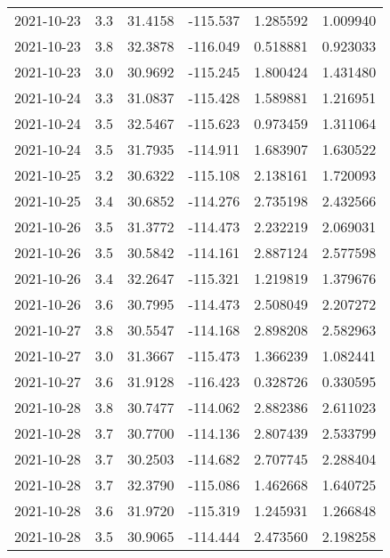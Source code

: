 \begin{tabular}{lrrrrr}
2021-10-23 &       3.3 &  31.4158 &  -115.537 &         1.285592 &         1.009940 \\
2021-10-23 &       3.8 &  32.3878 &  -116.049 &         0.518881 &         0.923033 \\
2021-10-23 &       3.0 &  30.9692 &  -115.245 &         1.800424 &         1.431480 \\
2021-10-24 &       3.3 &  31.0837 &  -115.428 &         1.589881 &         1.216951 \\
2021-10-24 &       3.5 &  32.5467 &  -115.623 &         0.973459 &         1.311064 \\
2021-10-24 &       3.5 &  31.7935 &  -114.911 &         1.683907 &         1.630522 \\
2021-10-25 &       3.2 &  30.6322 &  -115.108 &         2.138161 &         1.720093 \\
2021-10-25 &       3.4 &  30.6852 &  -114.276 &         2.735198 &         2.432566 \\
2021-10-26 &       3.5 &  31.3772 &  -114.473 &         2.232219 &         2.069031 \\
2021-10-26 &       3.5 &  30.5842 &  -114.161 &         2.887124 &         2.577598 \\
2021-10-26 &       3.4 &  32.2647 &  -115.321 &         1.219819 &         1.379676 \\
2021-10-26 &       3.6 &  30.7995 &  -114.473 &         2.508049 &         2.207272 \\
2021-10-27 &       3.8 &  30.5547 &  -114.168 &         2.898208 &         2.582963 \\
2021-10-27 &       3.0 &  31.3667 &  -115.473 &         1.366239 &         1.082441 \\
2021-10-27 &       3.6 &  31.9128 &  -116.423 &         0.328726 &         0.330595 \\
2021-10-28 &       3.8 &  30.7477 &  -114.062 &         2.882386 &         2.611023 \\
2021-10-28 &       3.7 &  30.7700 &  -114.136 &         2.807439 &         2.533799 \\
2021-10-28 &       3.7 &  30.2503 &  -114.682 &         2.707745 &         2.288404 \\
2021-10-28 &       3.7 &  32.3790 &  -115.086 &         1.462668 &         1.640725 \\
2021-10-28 &       3.6 &  31.9720 &  -115.319 &         1.245931 &         1.266848 \\
2021-10-28 &       3.5 &  30.9065 &  -114.444 &         2.473560 &         2.198258 \\

\end{tabular}
